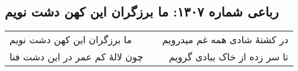 \begin{center}
\section*{رباعی شماره ۱۳۰۷: ما برزگران این کهن دشت نویم}
\label{sec:1307}
\begin{longtable}{l p{0.5cm} r}
ما برزگران این کهن دشت نویم
&&
در کشتهٔ شادی همه غم میدرویم
\\
چون لالهٔ کم عمر در این دشت فنا
&&
تا سر زده از خاک ببادی گرویم
\\
\end{longtable}
\end{center}
